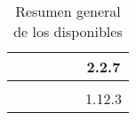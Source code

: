 \begin{table}[H]
\begin{tabular}{ |l|c|c|c|c|c| }
\\ \hline
	\nameWooCommerce &
	\mysqlNAME&
	\phpNAME&
	\wordPressNAME \cite{online_wordpress}&
	\gpllicense &
	2.2.7
	
\\ \hline
	\nameWPECommerce &
	&
	&
	&
	&
	
\\ \hline
	\nameJigoshop &
	\mysqlNAME&
	\phpNAME&
	\wordPressNAME \cite{online_wordpress}&
	\gpllicense &
	1.12.3
	
\\ \hline
\end{tabular}
    \caption{ Resumen general de los \frameworksPC disponibles}
    \label{tab:resume_technology_ecommerce}
\end{table}



%
% 
%	
%
%



